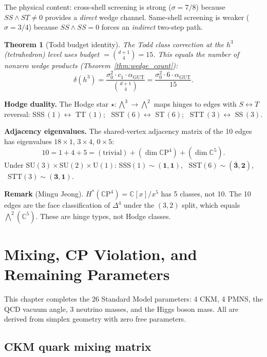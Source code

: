 \documentclass[12pt]{article}
\newtheorem{theorem}{Theorem}[section]
\theoremstyle{remark}
\theoremstyle{definition}
\newcommand{\CC}{\mathbb{C}}
\begin{document}
The physical content: cross-shell screening is strong ($\sigma = 7/8$) because $SS \wedge ST \neq 0$ provides a \emph{direct} wedge channel.  Same-shell screening is weaker ($\sigma = 3/4$) because $SS \wedge SS = 0$ forces an \emph{indirect} two-step path.

\begin{theorem}[Todd budget identity]
The Todd class correction at the $h^3$ (tetrahedron) level uses budget $= \binom{d+1}{4} = 15$.  This equals the number of nonzero wedge products (Theorem~\ref{thm:wedge_count}):
\[
\delta(h^3) = \frac{\sigma_0^2 \cdot c_1 \cdot \alpha_\text{GUT}}{\binom{d+1}{4}}
= \frac{\sigma_0^2 \cdot 6 \cdot \alpha_\text{GUT}}{15}.
\]
\end{theorem}

\noindent\textbf{Hodge duality.}
The Hodge star $\star\!: \bigwedge^3 \to \bigwedge^2$ maps hinges to edges with $S \leftrightarrow T$ reversal:
SSS$\,(1) \leftrightarrow$ TT$\,(1)$; \ SST$\,(6) \leftrightarrow$ ST$\,(6)$; \ STT$\,(3) \leftrightarrow$ SS$\,(3)$.

\smallskip\noindent\textbf{Adjacency eigenvalues.}
The shared-vertex adjacency matrix of the 10 edges has eigenvalues $18 \times 1$, $3 \times 4$, $0 \times 5$:
\[
10 = 1 + 4 + 5 = (\text{trivial}) + (\dim\CC\mathrm{P}^4) + (\dim\CC^5).
\]
Under SU$(3) \times$SU$(2) \times$U$(1)$:
SSS$(1) \sim (\mathbf{1},\mathbf{1})$, \
SST$(6) \sim (\bar{\mathbf{3}},\mathbf{2})$, \
STT$(3) \sim (\mathbf{3},\mathbf{1})$.

\smallskip\noindent\textbf{Remark} (Mingu Jeong).
$H^*(\CC\mathrm{P}^4) = \CC[x]/x^5$ has 5 classes, not 10.  The 10 edges are the face classification of $\Delta^4$ under the $(3,2)$ split, which equals $\bigwedge^2(\CC^5)$.  These are hinge types, not Hodge classes.

\section{Mixing, CP Violation, and Remaining Parameters}
\label{ch:mixing}

This chapter completes the 26 Standard Model parameters: 4 CKM, 4 PMNS, the QCD vacuum angle, 3 neutrino masses, and the Higgs boson mass. All are derived from simplex geometry with zero free parameters.

\subsection{CKM quark mixing matrix}
\end{document}
